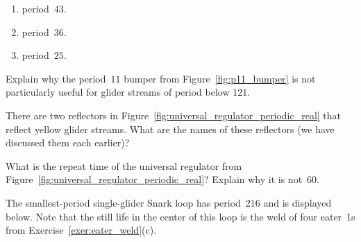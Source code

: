\begin{multicols}{2}
\begin{problem}
		\begin{enumerate}[label=\bf\color{ocre}(\alph*)]
			\item period~$43$.
			
			\item period~$36$.
			
			\item period~$25$.
		\end{enumerate}
	\end{problem}
	
	
	\mfilbreak
	
	
	\begin{problemstar}\label{exer:p11_bumper_not_useful} 
		Explain why the period~$11$ bumper from Figure~\ref{fig:p11_bumper} is not particularly useful for glider streams of period below $121$.
		
	\end{problemstar}


	\mfilbreak
	
	
	\begin{problem}\label{exer:p60_regulator_reflectors} 
		There are two reflectors in Figure~\ref{fig:universal_regulator_periodic_real} that reflect yellow glider streams. What are the names of these reflectors (we have discussed them each earlier)?
	\end{problem}
	
	
	\mfilbreak
	
	
	\begin{problem}\label{exer:universal_regulator_repeat_time} 
		What is the repeat time of the universal regulator from Figure~\ref{fig:universal_regulator_periodic_real}? Explain why it is not~$60$.
	\end{problem}
	
	
	\mfilbreak
	
	
	\begin{problemstar}\label{exer:minimum_period_snark_loop}
		The smallest-period single-glider Snark loop has period~$216$ and is displayed below. Note that the still life in the center of this loop is the weld of four eater~1s from Exercise~\ref{exer:eater_weld}(c).\smallskip
		
		\noindent\begin{center}
		\end{center}
		

\end{problemstar}
\end{multicols}
